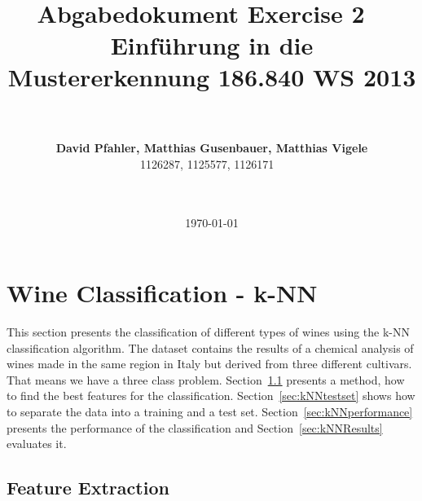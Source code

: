 \documentclass[subfigure,epsfig,fleqn,amssmb,float,caption,ausarbeitung]{scrartcl}
\begin{document}
\date{\today}

\title{~\\
  ~\\
  \fontsize{14}{14pt} \bf Abgabedokument Exercise 2
	 ~\\
  \fontsize{12}{12pt} \bf Einführung in die Mustererkennung 186.840 WS 2013}

\author{~\\
  ~\\
  \fontsize{12}{12pt}
  {\bf David Pfahler, Matthias Gusenbauer, Matthias Vigele}\\
  1126287, 1125577, 1126171
  ~\\ ~\\ ~\\
  \normalsize
}

\maketitle
\normalfont
\thispagestyle{empty}


\section{Wine Classification - k-NN}
\label{sec:kNN}

This section presents the classification of different types of wines using 
the k-NN classification algorithm. The dataset\cite{data} contains the results of a 
chemical analysis of wines made in the same region in Italy but derived from 
three different cultivars. That means we have a three class problem. 
Section~\ref{sec:features} presents a method, how to find the best features 
for the classification. Section~\ref{sec:kNNtestset} shows how to separate 
the data into a training and a test set. Section~\ref{sec:kNNperformance} 
presents the performance of the classification and Section~\ref{sec:kNNResults}
evaluates it.


\subsection{Feature Extraction}
\label{sec:features}
\end{document}

